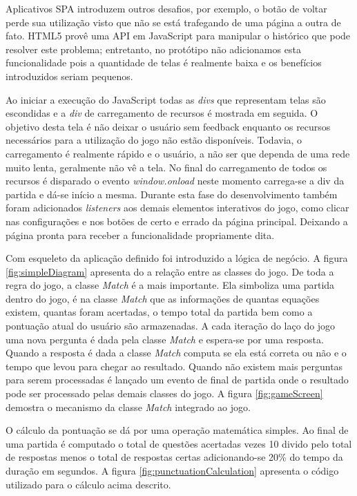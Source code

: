 Aplicativos SPA introduzem outros desafios, por exemplo,
o botão de voltar perde sua utilização visto que não se está
trafegando de uma página a outra de fato. HTML5 provê uma API em
JavaScript para manipular o histórico que pode resolver este problema;
entretanto, no protótipo não adicionamos esta funcionalidade pois
a quantidade de telas é realmente baixa e os benefícios introduzidos
seriam pequenos.

Ao iniciar a execução do JavaScript todas as \textit{divs} que
representam telas são escondidas e a \textit{div} de carregamento de
recursos é mostrada em seguida. O objetivo desta tela é não deixar
o usuário sem feedback enquanto os recursos necessários para a
utilização do jogo não estão disponíveis. Todavia, o carregamento
é realmente rápido e o usuário, a não ser que dependa de uma rede
muito lenta, geralmente não vê a tela. No final do carregamento
de todos os recursos é disparado o evento \textit{window.onload}
neste momento carrega-se a div da partida e dá-se início a mesma.
Durante esta fase do desenvolvimento também foram adicionados
\textit{listeners} aos demais elementos interativos do jogo, como
clicar nas configurações e nos botões de certo e errado da página
principal. Deixando a página pronta para receber a funcionalidade
propriamente dita.

Com esqueleto da aplicação definido foi introduzido a lógica
de negócio. A figura \ref{fig:simpleDiagram} apresenta do a
relação entre as classes do jogo. De toda a regra do jogo, a classe
\textit{Match} é a mais importante. Ela simboliza uma partida dentro
do jogo, é na classe \textit{Match} que as informações de quantas
equações existem, quantas foram acertadas, o tempo total da partida
bem como a pontuação atual do usuário são armazenadas. A cada
iteração do laço do jogo uma nova pergunta é dada pela classe
\textit{Match} e espera-se por uma resposta. Quando a resposta é dada
a classe \textit{Match} computa se ela está correta ou não e
o tempo que levou para chegar ao resultado. Quando não existem mais
perguntas para serem processadas é lançado um evento de final de
partida onde o resultado pode ser processado pelas demais classes do
jogo. A figura \ref{fig:gameScreen} demostra o mecanismo da classe
\textit{Match} integrado ao jogo.

O cálculo da pontuação se dá por uma operação matemática simples.
Ao final de uma partida é computado o total de questões acertadas
vezes 10 divido pelo total de respostas menos o total de respostas
certas adicionando-se 20\% do tempo da duração em segundos. A figura
\ref{fig:punctuationCalculation} apresenta o código utilizado para o
cálculo acima descrito.

